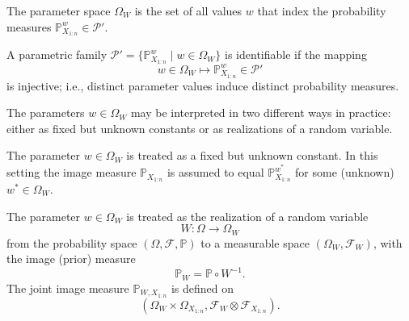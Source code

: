 \begin{definition}
	\label{def:parameter_space}
	The parameter space $\Omega_W$ is the set of all values $w$ that index the probability measures $\mathbb{P}^w_{X_{1:n}} \in \mathcal{P}'$.
\end{definition}

\begin{definition}
	A parametric family $\mathcal{P}' = \{ \mathbb{P}^w_{X_{1:n}} \mid w \in \Omega_W \}$ is identifiable if the mapping
	\begin{equation}
		w \in \Omega_W \mapsto \mathbb{P}^w_{X_{1:n}} \in \mathcal{P}'
	\end{equation}
	is injective; i.e., distinct parameter values induce distinct probability measures.
\end{definition}

The parameters $w \in \Omega_W$ may be interpreted in two different ways in practice: either as fixed but unknown constants or as realizations of a random variable.

\begin{axiom}
	\label{ax:parameter_fixed}
	The parameter $w \in \Omega_W$ is treated as a fixed but unknown constant. In this setting the image measure $\mathbb{P}_{X_{1:n}}$ is assumed to equal $\mathbb{P}^{w^*}_{X_{1:n}}$ for some (unknown) $w^* \in \Omega_W$.
\end{axiom}

\begin{axiom}
	\label{ax:parameter_variable}
	The parameter $w \in \Omega_W$ is treated as the realization of a random variable
	\begin{equation}
		W:\Omega \to \Omega_W
	\end{equation}
	from the probability space $(\Omega, \mathcal{F}, \mathbb{P})$ to a measurable space $(\Omega_W, \mathcal{F}_W)$, with the image (prior) measure
	\begin{equation}
		\mathbb{P}_W = \mathbb{P} \circ W^{-1}.
	\end{equation}
 	The joint image measure $\mathbb{P}_{W,X_{1:n}}$ is defined on 
	\begin{equation}
		(\Omega_W \times \Omega_{X_{1:n}}, \mathcal{F}_W \otimes \mathcal{F}_{X_{1:n}}).
	\end{equation}
\end{axiom}

